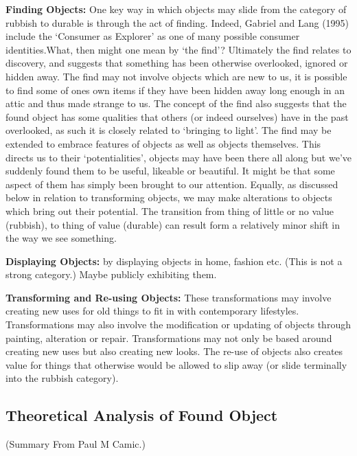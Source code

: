 \textbf{Finding Objects:} One key way in which objects may slide from the category of rubbish to durable is through the act of finding. Indeed, Gabriel and Lang (1995) include the ‘Consumer as Explorer’ as one of many possible consumer identities.What, then might one mean by ‘the find’? Ultimately the find relates to discovery, and suggests that something has been otherwise overlooked, ignored or hidden away. The find may not involve objects which are new to us, it is possible to find some of ones own items if they have been hidden away long enough in an attic and thus made strange to us. The concept of the find also suggests that the found object has some qualities that others (or indeed ourselves) have in the past overlooked, as such it is closely related to ‘bringing to light’. The find may be extended to embrace features of objects as well as objects themselves. This directs us to their ‘potentialities’, objects may have been there all along but we’ve suddenly found them to be useful, likeable or beautiful. It might be that some aspect of them has simply been brought to our attention. Equally, as discussed below in relation to transforming objects, we may make alterations to objects which bring out their potential. The transition from thing of little or no value (rubbish), to thing of value (durable) can result form a relatively minor shift in the way we see something.

\textbf{Displaying Objects:} by displaying objects in home, fashion etc. (This is not a strong category.) Maybe publicly exhibiting them. 

\textbf{Transforming and Re-using Objects:} These transformations may involve creating new uses for old things to fit in with contemporary lifestyles. Transformations may also involve the modification or updating of objects through painting, alteration or repair. Transformations may not only be based around creating new uses but also creating new looks. The re-use of objects also creates value for things that otherwise would be allowed to slip away (or slide terminally into the rubbish category).

\subsection{Theoretical Analysis of Found Object}
(Summary From Paul M Camic.) 

